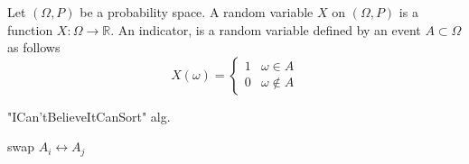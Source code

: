 \begin{definition}
  Let $(\Omega,P)$ be a probability space. A random variable $X$ on $(\Omega,P)$ is a function $X : \Omega \rightarrow \mathbb{R}$. An indicator, is a random variable defined by an event $A \subset \Omega$ as follows   
  \begin{equation*}
    X(\omega) = \begin{cases}
      1 & \omega \in A \\
      0 & \omega \notin A
    \end{cases}
  \end{equation*}
\end{definition}


\begin{algorithm}
\SetAlgoLined
{}
\caption{ "ICan'tBelieveItCanSort"  alg.}
 {
   {
     {
      swap $A_{i} \leftrightarrow A_{j}$
    }
  }
}


\end{algorithm}




